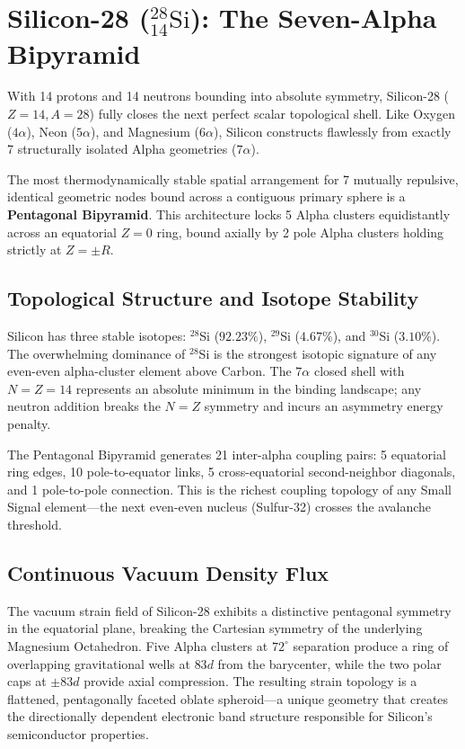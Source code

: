 \chapter{Silicon-28 ($^{28}_{14}\text{Si}$): The Seven-Alpha Bipyramid}
\label{ch:silicon}

With 14 protons and 14 neutrons bounding into absolute symmetry, Silicon-28 ($Z=14, A=28$) fully closes the next perfect scalar topological shell. Like Oxygen ($4\alpha$), Neon ($5\alpha$), and Magnesium ($6\alpha$), Silicon constructs flawlessly from exactly 7 structurally isolated Alpha geometries ($7\alpha$).

The most thermodynamically stable spatial arrangement for 7 mutually repulsive, identical geometric nodes bound across a contiguous primary sphere is a \textbf{Pentagonal Bipyramid}. This architecture locks 5 Alpha clusters equidistantly across an equatorial $Z=0$ ring, bound axially by 2 pole Alpha clusters holding strictly at $Z = \pm R$.

\section{Topological Structure and Isotope Stability}
Silicon has three stable isotopes: $^{28}$Si ($92.23\%$), $^{29}$Si ($4.67\%$), and $^{30}$Si ($3.10\%$). The overwhelming dominance of $^{28}$Si is the strongest isotopic signature of any even-even alpha-cluster element above Carbon. The $7\alpha$ closed shell with $N=Z=14$ represents an absolute minimum in the binding landscape; any neutron addition breaks the $N=Z$ symmetry and incurs an asymmetry energy penalty.

The Pentagonal Bipyramid generates 21 inter-alpha coupling pairs: 5 equatorial ring edges, 10 pole-to-equator links, 5 cross-equatorial second-neighbor diagonals, and 1 pole-to-pole connection. This is the richest coupling topology of any Small Signal element---the next even-even nucleus (Sulfur-32) crosses the avalanche threshold.

\section{Continuous Vacuum Density Flux}
The vacuum strain field of Silicon-28 exhibits a distinctive pentagonal symmetry in the equatorial plane, breaking the Cartesian symmetry of the underlying Magnesium Octahedron. Five Alpha clusters at $72^\circ$ separation produce a ring of overlapping gravitational wells at $83d$ from the barycenter, while the two polar caps at $\pm 83d$ provide axial compression. The resulting strain topology is a flattened, pentagonally faceted oblate spheroid---a unique geometry that creates the directionally dependent electronic band structure responsible for Silicon's semiconductor properties.

